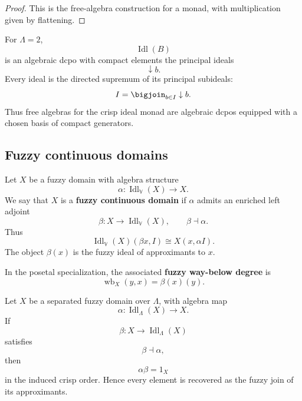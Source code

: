 \begin{proof}
This is the free-algebra construction for a monad, with multiplication given by
flattening.
\end{proof}

\begin{example}
\label{ex:crisp-algebraic-domains}
For \(\Lambda=2\),
\[
    \operatorname{Idl}(B)
\]
is an algebraic dcpo with compact elements the principal ideals
\[
    \downarrow b.
\]
Every ideal is the directed supremum of its principal subideals:
\[
    I=\bigjoin_{b\in I}\downarrow b.
\]
Thus free algebras for the crisp ideal monad are algebraic dcpos equipped with a
chosen basis of compact generators.
\end{example}

\subsection{Fuzzy continuous domains}
\label{subsec:fuzzy-continuous-domains}

\begin{definition}
\label{def:fuzzy-continuous-domain-enriched}
Let \(X\) be a fuzzy domain with algebra structure
\[
    \alpha:\operatorname{Idl}_{\mathbb V}(X)\to X.
\]
We say that \(X\) is a \textbf{fuzzy continuous domain} if \(\alpha\) admits an
enriched left adjoint
\[
    \beta:X\to\operatorname{Idl}_{\mathbb V}(X),
    \qquad
    \beta\dashv\alpha.
\]
Thus
\[
    \operatorname{Idl}_{\mathbb V}(X)(\beta x,I)
    \cong
    X(x,\alpha I).
\]
The object \(\beta(x)\) is the fuzzy ideal of approximants to \(x\).
\end{definition}

\begin{definition}
\label{def:fuzzy-way-below-degree}
In the posetal specialization, the associated \textbf{fuzzy way-below degree} is
\[
    \operatorname{wb}_X(y,x)
    =
    \beta(x)(y).
\]
\end{definition}

\begin{proposition}
\label{prop:fuzzy-continuity-adjunction}
Let \(X\) be a separated fuzzy domain over \(\Lambda\), with algebra map
\[
    \alpha:\operatorname{Idl}_\Lambda(X)\to X.
\]
If
\[
    \beta:X\to\operatorname{Idl}_\Lambda(X)
\]
satisfies
\[
    \beta\dashv\alpha,
\]
then
\[
    \alpha\beta=1_X
\]
in the induced crisp order.  Hence every element is recovered as the fuzzy join of
its approximants.
\end{proposition}

